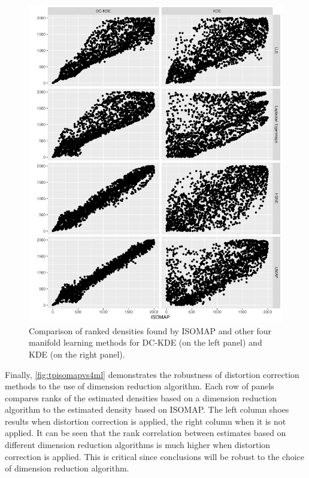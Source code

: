 \documentclass[11pt,a4paper,]{article}
\begin{document}
\begin{figure}

{\centering \includegraphics[width=0.95\linewidth]{figures/Twin Peak2000_density_compare_isomapvs4ml_radius8_r0_5_rank} 

}

\caption{Comparison of ranked densities found by ISOMAP and other four manifold learning methods for DC-KDE (on the left panel) and KDE (on the right panel).}\label{fig:tpisomapvs4ml}
\end{figure}

Finally, \autoref{fig:tpisomapvs4ml} demonstrates the robustness of distortion correction methods to the use of dimension reduction algorithm. Each row of panels compares ranks of the estimated densities based on a dimension reduction algorithm to the estimated density based on ISOMAP. The left column shoes results when distortion correction is applied, the right column when it is not applied. It can be seen that the rank correlation between estimates based on different dimension reduction algorithms is much higher when distortion correction is applied. This is critical since conclusions will be robust to the choice of dimension reduction algorithm.
\end{document}
